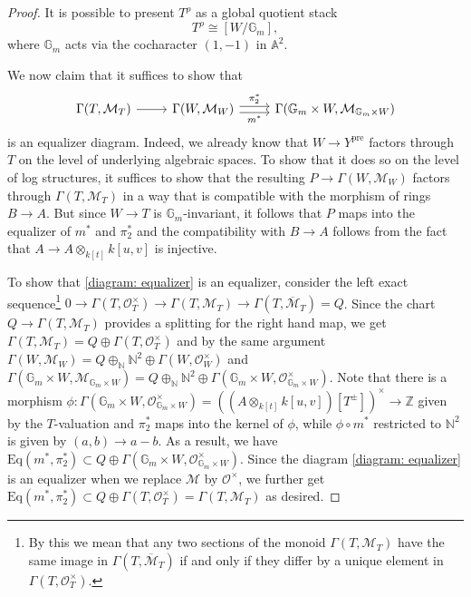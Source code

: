 \documentclass[11pt]{amsart}
\theoremstyle{definition}
\theoremstyle{definition}
\newcommand{\cM}{\mathcal{M}}
\newcommand{\cO}{\mathcal{O}}
\newcommand{\cal}{\mathcal}
\def\cM{{\cal M}}
\def\cO{{\cal O}}
\begin{document}
\begin{proof}
    It is possible to present $T^\rho$ as a global quotient stack
    $$T^\rho \cong [W/\mathbb{G}_m],$$ where $\mathbb{G}_m$ acts via the cocharacter $(1,-1)$ in $\mathbb{A}^2$. 
    
    We now claim that it suffices to show that
    \begin{equation}\label{diagram: equalizer}
    \begin{tikzcd}
        \Gamma(T,\cM_T)\rar &\Gamma(W,\cM_W)\rar["m^*"'
        , shift right] \rar["\pi_2^*", shift left] &\Gamma(\mathbb{G}_m\times W,\cM_{\mathbb{G}_m\times W})
    \end{tikzcd}
    \end{equation}
    is an equalizer diagram. Indeed, we already know that $W\rightarrow Y^{\text{pre}}$ factors through $T$ on the level of underlying algebraic spaces. To show that it does so on the level of log structures, it suffices to show that the resulting $P\rightarrow \Gamma(W,\cM_W)$ factors through $\Gamma(T,\cM_T)$ in a way that is compatible with the morphism of rings $B\rightarrow A$. But since $W\rightarrow T$ is $\mathbb{G}_m$-invariant, it follows that $P$ maps into the equalizer of $m^*$ and $\pi_2^*$ and the compatibility with $B\rightarrow A$ follows from the fact that $A\rightarrow A\otimes_{k[t]}k[u,v]$ is injective.

    To show that \eqref{diagram: equalizer} is an equalizer, consider the left exact sequence\footnote{By this we mean that any two sections of the monoid $\Gamma(T,\cM_T)$ have the same image in $\Gamma(T,\overline{\cM}_T)$ if and only if they differ by a unique element in $\Gamma(T,\cO_T^\times)$.} $0\rightarrow \Gamma(T,\cO_T^\times)\rightarrow \Gamma(T,\cM_T)\rightarrow \Gamma(T,\overline{\cM}_T) = Q$. Since the chart $Q\rightarrow \Gamma(T,\cM_T)$ provides a splitting for the right hand map, we get $\Gamma(T,\cM_T) = Q\oplus \Gamma(T,\cO^\times_T)$ and by the same argument $\Gamma(W,\cM_W) = Q\oplus_{\mathbb{N}}\mathbb{N}^2\oplus \Gamma(W,\cO^\times_W)$ and $\Gamma(\mathbb{G}_m\times W,\cM_{\mathbb{G}_m\times W}) = Q\oplus_{\mathbb{N}}\mathbb{N}^2\oplus \Gamma(\mathbb{G}_m\times W,\cO^\times_{\mathbb{G}_m\times W})$. Note that there is a morphism $\phi\colon \Gamma(\mathbb{G}_m\times W,\cO^\times_{\mathbb{G}_m\times W}) = ((A\otimes_{k[t]}k[u,v])[T^\pm])^\times\rightarrow \mathbb{Z}$ given by the $T$-valuation and $\pi_2^*$ maps into the kernel of $\phi$, while $\phi\circ m^*$ restricted to $\mathbb{N}^2$ is given by $(a,b)\rightarrow a-b$. As a result, we have $\text{Eq}(m^*,\pi_2^*) \subset Q\oplus \Gamma(\mathbb{G}_m\times W,\cO^\times_{\mathbb{G}_m\times W})$. Since the diagram \eqref{diagram: equalizer} is an equalizer when we replace $\cM$ by $\cO^\times$, we further get $\text{Eq}(m^*,\pi_2^*)\subset Q\oplus \Gamma(T,\cO^\times_T) = \Gamma(T,\cM_T)$ as desired.
 \end{proof}
\end{document}
